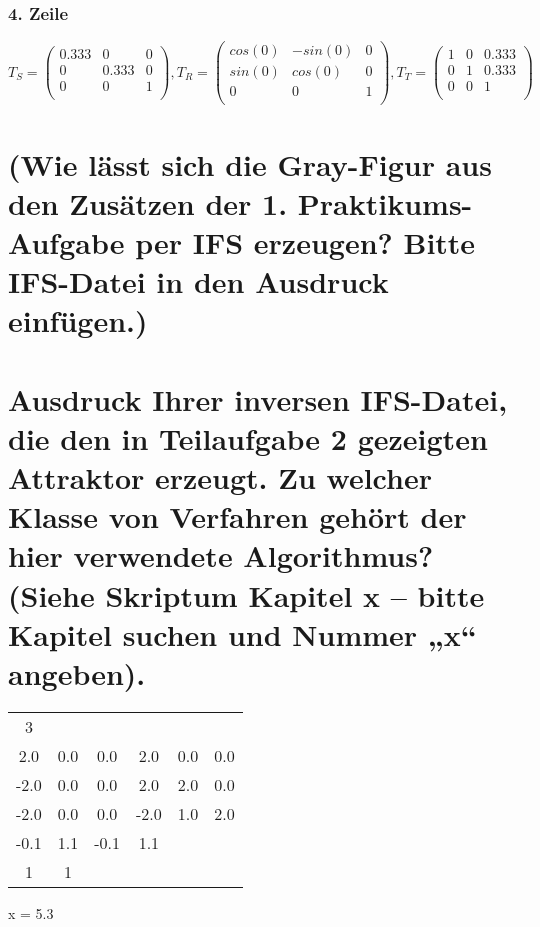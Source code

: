 \documentclass[]{article}
\begin{document}
\subsubsection*{4. Zeile}
\[
T_S = \begin{pmatrix}
0.333 & 0 & 0 \\
0 & 0.333 & 0 \\
0 & 0 & 1 \\
\end{pmatrix},
T_R = \begin{pmatrix}
cos(0) & -sin(0) & 0 \\
sin(0) & cos(0) & 0 \\
0 & 0 & 1 \\
\end{pmatrix},
T_T = \begin{pmatrix}
1 & 0 & 0.333 \\
0 & 1 & 0.333 \\
0 & 0 & 1 \\
\end{pmatrix}
\]

\section{(Wie lässt sich die Gray-Figur aus den Zusätzen der 1. Praktikums-Aufgabe per IFS erzeugen? Bitte IFS-Datei in den Ausdruck einfügen.)} 



\section{Ausdruck Ihrer inversen IFS-Datei, die den in Teilaufgabe 2 gezeigten Attraktor erzeugt. Zu welcher Klasse von Verfahren gehört der hier verwendete Algorithmus? (Siehe Skriptum Kapitel x – bitte Kapitel suchen und Nummer „x“ angeben).}

\begin{tabular}{cccccc}
	3 &  &  &  &  &  \\ 
	2.0 & 0.0 & 0.0 & 2.0 & 0.0 & 0.0 \\ 
	-2.0 & 0.0 & 0.0 & 2.0 & 2.0 & 0.0 \\ 
	-2.0 & 0.0 & 0.0 & -2.0 & 1.0 & 2.0 \\ 
	-0.1 & 1.1 & -0.1 & 1.1 &  &  \\ 
	1 & 1 &  &  &  & 
\end{tabular}

x = 5.3
\end{document}
